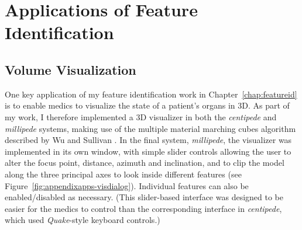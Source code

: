 \chapter{Applications of Feature Identification}
\label{chap:appendixapps}

\section{Volume Visualization}


One key application of my feature identification work in Chapter~\ref{chap:featureid} is to enable medics to visualize the state of a patient's organs in 3D. As part of my work, I therefore implemented a 3D visualizer in both the \emph{centipede} and \emph{millipede} systems, making use of the multiple material marching cubes algorithm described by Wu and Sullivan \cite{wu03}. In the final system, \emph{millipede}, the visualizer was implemented in its own window, with simple slider controls allowing the user to alter the focus point, distance, azimuth and inclination, and to clip the model along the three principal axes to look inside different features (see Figure~\ref{fig:appendixapps-visdialog}). Individual features can also be enabled/disabled as necessary. (This slider-based interface was designed to be easier for the medics to control than the corresponding interface in \emph{centipede}, which used \emph{Quake}-style keyboard controls.)


